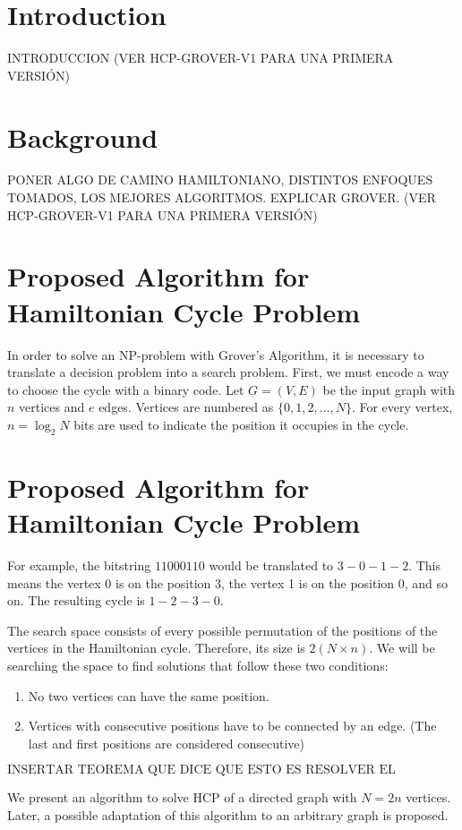 \documentclass{article}
\begin{document}
\section{Introduction}
INTRODUCCION (VER HCP-GROVER-V1 PARA UNA PRIMERA VERSIÓN)

\section{Background}
PONER ALGO DE CAMINO HAMILTONIANO, DISTINTOS ENFOQUES TOMADOS, LOS MEJORES ALGORITMOS. EXPLICAR GROVER. (VER HCP-GROVER-V1 PARA UNA PRIMERA VERSIÓN)

\section{Proposed Algorithm for Hamiltonian Cycle Problem}
In order to solve an NP-problem with Grover’s Algorithm, it is necessary to translate a decision problem into a search problem. First, we must encode a way to choose the cycle with a binary code. Let \(G = (V, E)\) be the input graph with $n$ vertices and $e$ edges. Vertices are numbered as $\{0, 1, 2, \ldots, N\}$. For every vertex, $n = \log_2 N$ bits are used to indicate the position it occupies in the cycle.

\section{Proposed Algorithm for Hamiltonian Cycle Problem}
For example, the bitstring $11000110$ would be translated to $3 - 0 - 1 - 2$. This means the vertex 0 is on the position 3, the vertex 1 is on the position 0, and so on. The resulting cycle is $1 - 2 - 3 - 0$.

The search space consists of every possible permutation of the positions of the vertices in the Hamiltonian cycle. Therefore, its size is $2(N \times n)$. We will be searching the space to find solutions that follow these two conditions:
\begin{enumerate}
    \item No two vertices can have the same position.
    \item Vertices with consecutive positions have to be connected by an edge. (The last and first positions are considered consecutive)
\end{enumerate}

$$\text{INSERTAR TEOREMA QUE DICE QUE ESTO ES RESOLVER EL PROBLEMA DEL CICLO HAMILTONIANO}$$

We present an algorithm to solve HCP of a directed graph with $N = 2n$ vertices. Later, a possible adaptation of this algorithm to an arbitrary graph is proposed.
\end{document}
